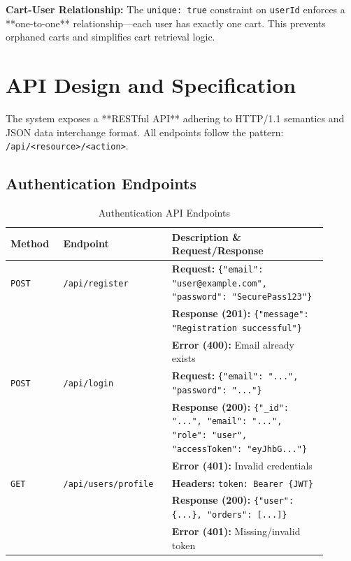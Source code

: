 \textbf{Cart-User Relationship:} The \texttt{unique: true} constraint on \texttt{userId} enforces a **one-to-one** relationship—each user has exactly one cart. This prevents orphaned carts and simplifies cart retrieval logic.

\section{API Design and Specification}

The system exposes a **RESTful API** adhering to HTTP/1.1 semantics and JSON data interchange format. All endpoints follow the pattern: \texttt{/api/<resource>/<action>}.

\subsection{Authentication Endpoints}

\begin{table}[H]
\centering
\caption{Authentication API Endpoints}
\label{tab:api_auth}
\small
\begin{tabular}{@{}p{0.15\linewidth}p{0.30\linewidth}p{0.45\linewidth}@{}}
\toprule
\textbf{Method} & \textbf{Endpoint} & \textbf{Description \& Request/Response} \\
\midrule
\texttt{POST} & \texttt{/api/register} & 
\textbf{Request:} \texttt{\{"email": "user@example.com", "password": "SecurePass123"\}} \\
& & \textbf{Response (201):} \texttt{\{"message": "Registration successful"\}} \\
& & \textbf{Error (400):} Email already exists \\
\midrule
\texttt{POST} & \texttt{/api/login} & 
\textbf{Request:} \texttt{\{"email": "...", "password": "..."\}} \\
& & \textbf{Response (200):} \texttt{\{"\_id": "...", "email": "...", "role": "user", "accessToken": "eyJhbG..."\}} \\
& & \textbf{Error (401):} Invalid credentials \\
\midrule
\texttt{GET} & \texttt{/api/users/profile} & 
\textbf{Headers:} \texttt{token: Bearer \{JWT\}} \\
& & \textbf{Response (200):} \texttt{\{"user": \{...\}, "orders": [...]\}} \\
& & \textbf{Error (401):} Missing/invalid token \\
\bottomrule
\end{tabular}
\end{table}

